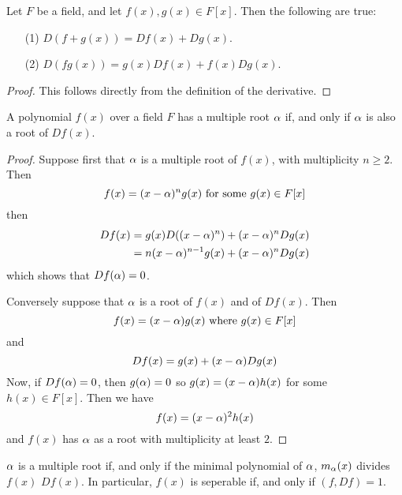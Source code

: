 \begin{proposition}\label{proposition_8.6.1}
  Let $F$ be a field, and let $f(x),g(x) \in F[x]$. Then the following
  are true:
  \begin{enumerate}
    \item[(1)] $D{(f+g(x))}=D{f(x)}+D{g(x)}$.

    \item[(2)] $D{(fg(x))}=g(x)D{f(x)}+f(x)D{g(x)}$.
  \end{enumerate}
\end{proposition}
\begin{proof}
  This follows directly from the definition of the derivative.
\end{proof}

\begin{proposition}\label{proposition_8.6.2}
  A polynomial $f(x)$ over a field $F$ has a multiple root $\alpha$ if,
  and only if $\alpha$ is also a root of $D{f(x)}$.
\end{proposition}
\begin{proof}
  Suppose first that $\alpha$ is a multiple root of $f(x)$, with
  multiplicity $n \geq 2$. Then
  \begin{equation*}
    f(x)=(x-\alpha)^ng(x) \text{ for some } g(x) \in F[x]
  \end{equation*}
  then
  \begin{align*}
    D{f(x)} &= g(x)D{((x-\alpha)^n)}+(x-\alpha)^nD{g(x)} \\
      &= n(x-\alpha)^{n-1}g(x)+(x-\alpha)^nD{g(x)} \\
  \end{align*}
  which shows that $D{f(\alpha)}=0$.

  Conversely suppose that $\alpha$ is a root of $f(x)$ and of $D{f(x)}$.
  Then
  \begin{equation*}
    f(x)=(x-\alpha)g(x) \text{ where } g(x) \in F[x]
  \end{equation*}
  and
  \begin{equation*}
    D{f(x)}=g(x)+(x-\alpha)D{g(x)}
  \end{equation*}
  Now, if $D{f(\alpha)}=0$, then $g(\alpha)=0$ so $g(x)=(x-\alpha)h(x)$ for some
  $h(x) \in F[x]$. Then we have
  \begin{equation*}
    f(x)=(x-\alpha)^2h(x)
  \end{equation*}
  and $f(x)$ has $\alpha$ as a root with multiplicity at least $2$.
\end{proof}
\begin{corollary}
  $\alpha$ is a multiple root if, and only if the minimal polynomial of
  $\alpha$, $m_\alpha(x)$ divides $f(x)$ $D{f(x)}$. In particular, $f(x)$ is
  seperable if, and only if $(f,D{f})=1$.
\end{corollary}
